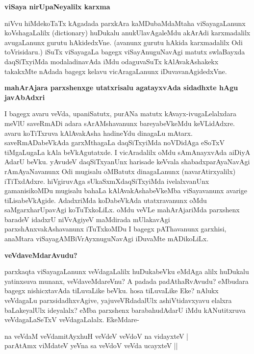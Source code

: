 {\bigskip
\noindent
{\large\bf viSaya nirUpaNeyalilx karxma}}\label{page131a}
\medskip

\noindent
niVvu hiMdekoTaTx kAgadada parxkAra kaMDubaMdaMtaha viSayagaLanunx koVshagaLalilx ({\rm dictionary}) huDukalu anukUlavAgaleMdu akArAdi karxmadalilx avugaLanunx gurutu hAkidedxVne. (avanunx gurutu hAkida karxmadalilx Odi toVrisidaru.) iSuTx viSayagaLa bagegx viSayAnuguNavAgi matutx swlaBayxda daqSiTxyiMda modaladinavAda iMdu odaguvaSuTx kAlAvakAshakekx takakxMte nAdada bagegx kelavu vicAragaLanunx iDuvavanAgidedxVne.

\newpage

{\bigskip
\noindent
{\large\bf mahArAjara parxshenxge utatxrisalu agatayxvAda sidadhxte hAgu javAbAdxri}}\label{page131b}
\medskip

\noindent
I bagegx avaru veVda, upaniSatutx, purANa matutx kAvayx-ivugaLelalxdara meVlU saveRmADi adara sArAMshavanunx bareyabeVkeMdu keVLidAdxre. avaru koTiTxruva kAlAvakAsha hadineYdu dinagaLu mAtarx. saveRmADabeVkAda garxMthagaLa daqSiTxyiMda noVDidAga eSoTxV tiMgaLugaLa kAla beVkAgutatxde. I vicAradalilx oMdu sAmAnayxvAda aiDiyA AdarU beVku. yAvudeV daqSiTxyanUnx harisade keVvala shabadxparAyaNavAgi rAmAyaNavanunx Odi mugisalu oMBatutx dinagaLanunx (navarAtirxyalilx) iTiTxdAdxre. hiVgiruvAga sUkaSxmXdaqSiTxyiMda ivelalxvanUnx gamanisikoMDu mugisalu bahaLa kAlAvakAshabeVkeMba viSayavanunx avarige tiLisabeVkAgide. AdadxriMda koDabeVkAda utatxravanunx oMdu saMgarxharUpavAgi koTuTxkoLiLx. oMdu veVLe mahArAjariMda parxshenx baradeV idadxrU niVvAgiyeV maMdirada mUlakavAgi parxshAnxvakAshavanunx iTuTxkoMDu I bagegx pAThavanunx garxhisi, anaMtara viSayagAMBiVrAyxnuguNavAgi iDuvaMte mADikoLiLx.

{\bigskip
\noindent
{\large\bf veVdaveMdarAvudu?}}\label{page132}
\medskip

\noindent
parxkaqta viSayagaLanunx veVdagaLalilx huDukabeVku eMdAga alilx huDukalu yatinxsuva munanx, veVdaveMdareVnu? A padada padAthaRvAvudu? eMbudara bagegx nishicxtavAda tiLuvaLike beVku. hosa tiLuvaLike Eke? nAlukx veVdagaLu parxsidadhxvAgive, yajuveVRdadalUlx ashiVtidavxyavu elalxra baLakeyalUlx ideyalalx? eMba parxshenx barabahudAdarU iMdu kANutitxruva veVdagaLaSeTxV veVdagaLalalx. EkeMdare-

\begin{shloka}
na veVdaM veVdamitAyxhuH veVdeV veVdoV na vidayxteV |\\\label{132}
parAtAmx viMdateV yeVna sa veVdoV veVda ucayxteV ||
\end{shloka}


